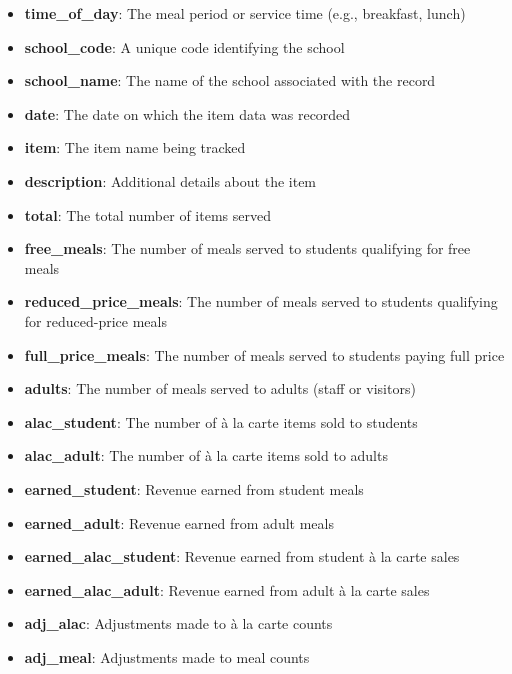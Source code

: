 \documentclass{scrartcl}
\begin{document}
\begin{itemize}
    \item \textbf{time\_of\_day}: The meal period or service time (e.g., breakfast, lunch)
    \item \textbf{school\_code}: A unique code identifying the school
    \item \textbf{school\_name}: The name of the school associated with the record
    \item \textbf{date}: The date on which the item data was recorded
    \item \textbf{item}: The item name being tracked
    \item \textbf{description}: Additional details about the item
    \item \textbf{total}: The total number of items served
    \item \textbf{free\_meals}: The number of meals served to students qualifying for free meals
    \item \textbf{reduced\_price\_meals}: The number of meals served to students qualifying for reduced-price meals
    \item \textbf{full\_price\_meals}: The number of meals served to students paying full price
    \item \textbf{adults}: The number of meals served to adults (staff or visitors)
    \item \textbf{alac\_student}: The number of à la carte items sold to students
    \item \textbf{alac\_adult}: The number of à la carte items sold to adults
    \item \textbf{earned\_student}: Revenue earned from student meals
    \item \textbf{earned\_adult}: Revenue earned from adult meals
    \item \textbf{earned\_alac\_student}: Revenue earned from student à la carte sales
    \item \textbf{earned\_alac\_adult}: Revenue earned from adult à la carte sales
    \item \textbf{adj\_alac}: Adjustments made to à la carte counts
    \item \textbf{adj\_meal}: Adjustments made to meal counts
\end{itemize}
\end{document}
